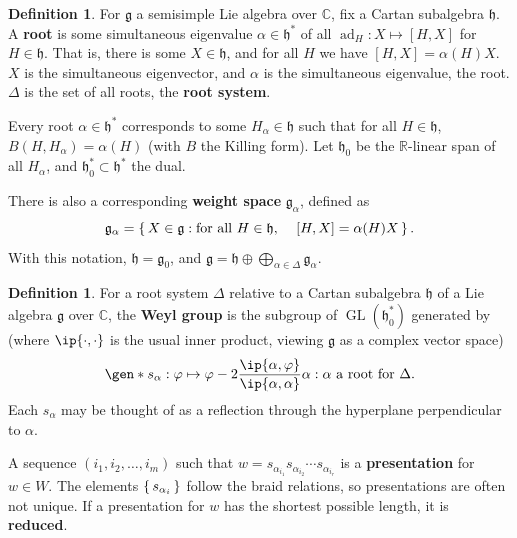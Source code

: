 \documentclass{amsart}
\theoremstyle{plain}
\theoremstyle{definition}
\newtheorem{definition}[theorem]{Definition}
\theoremstyle{remark}
\newcommand{\defined}[1]{\textbf{#1}}
\newcommand{\roots}{\Delta}
\DeclareMathOperator{\ad}{ad}
\DeclareMathOperator{\GL}{GL}
\DeclarePairedDelimiter\gen\langle\rangle
\DeclarePairedDelimiter\ip\langle\rangle
\begin{document}
  \begin{definition}
    For $\mathfrak{g}$ a semisimple Lie algebra over $\mathbb{C}$, fix a
    Cartan subalgebra $\mathfrak{h}$. A \defined{root} is some
    simultaneous eigenvalue $\alpha \in \mathfrak{h}^{\ast}$ of all
    $\ad_H : X \mapsto [H, X]$ for $H \in \mathfrak{h}$. That is, there
    is some $X \in \mathfrak{h}$, and for all $H$ we have $[H, X] =
    \alpha(H) X$. $X$ is the simultaneous eigenvector, and $\alpha$ is
    the simultaneous eigenvalue, the root. $\roots$ is the set of all
    roots, the \defined{root system}.

    Every root $\alpha \in \mathfrak{h}^{\ast}$ corresponds to some
    $H_{\alpha} \in \mathfrak{h}$ such that for all $H \in
    \mathfrak{h}$, $B(H, H_{\alpha}) = \alpha(H)$ (with $B$ the Killing
    form). Let $\mathfrak{h}_0$ be the $\mathbb{R}$-linear span of all
    $H_{\alpha}$, and $\mathfrak{h}_0^{\ast} \subset
    \mathfrak{h}^{\ast}$ the dual.

    There is also a corresponding \defined{weight space}
    $\mathfrak{g}_{\alpha}$, defined as \[ \mathfrak{g}_{\alpha} =
      \set{X \in \mathfrak{g} : \text{for all $H \in \mathfrak{h}$,
          \quad $[H, X] = \alpha(H)X$}}. \] With this notation,
    $\mathfrak{h} = \mathfrak{g}_0$, and $\mathfrak{g} = \mathfrak{h}
    \oplus \bigoplus_{\alpha \in \roots} \mathfrak{g}_{\alpha}$.
  \end{definition}

  \begin{definition}
    For a root system $\roots$ relative to a Cartan subalgebra
    $\mathfrak{h}$ of a Lie algebra $\mathfrak{g}$ over $\mathbb{C}$,
    the \defined{Weyl group} is the subgroup of
    $\GL(\mathfrak{h}_0^{\ast})$ generated by (where $\ip{\cdot, \cdot}$
    is the usual inner product, viewing $\mathfrak{g}$ as a complex
    vector space) \[ \gen*{{s_{\alpha} : \varphi \mapsto \varphi -
          2\frac{\ip{\alpha, \varphi}}{\ip{\alpha, \alpha}}\alpha} :
        \text{$\alpha$ a root for $\roots$}.} \] Each $s_{\alpha}$ may
    be thought of as a reflection through the hyperplane perpendicular
    to $\alpha$.

    A sequence $(i_1, i_2, \dotsc, i_m)$ such that $w = s_{\alpha_{i_1}}
    s_{\alpha_{i_2}} \dotsb s_{\alpha_{i_r}}$ is a
    \defined{presentation} for $w \in W$. The elements
    $\set{s_{\alpha_i}}$ follow the braid relations, so presentations
    are often not unique. If a presentation for $w$ has the shortest
    possible length, it is \defined{reduced}.
  \end{definition}
\end{document}
